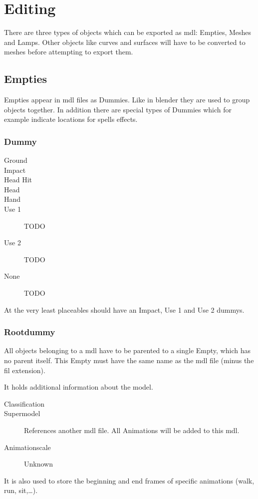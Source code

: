 \section{Editing}
There are three types of objects which can be exported as mdl: Empties,
Meshes and Lamps. Other objects like curves and surfaces will have to be
converted to meshes before attempting to export them.

\subsection{Empties}
Empties appear in mdl files as Dummies. Like in blender they are used to group
objects together. In addition there are special types of Dummies which for
example indicate locations for spells effects.

\subsubsection{Dummy}

\begin{description}
    \item[Ground]
    \item[Impact]
    \item[Head Hit]
    \item[Head]
    \item[Hand]
    \item[Use 1] TODO
    \item[Use 2] TODO
    \item[None] TODO
\end{description}
At the very least placeables should have an Impact, Use 1 and Use 2 dummys.

\subsubsection{Rootdummy}
All objects belonging to a mdl have to be parented to a single Empty, which
has no parent itself. This Empty must have the same name as the mdl file
(minus the fil extension).

It holds additional information about the model.
\begin{description}
    \item[Classification]
    \item[Supermodel] References another mdl file. All Animations will be added to this mdl.
    \item[Animationscale] Unknown
\end{description}
It is also used to store the beginning and end frames of specific animations
(walk, run, sit,\ldots).

